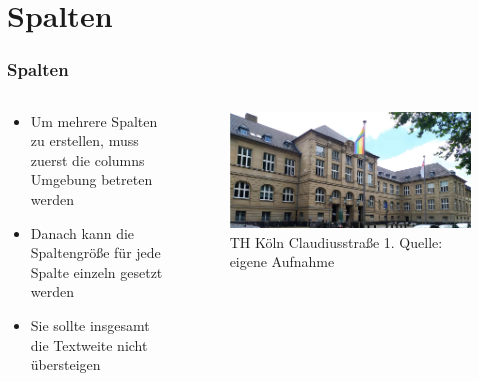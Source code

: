 \documentclass[aspectratio=169]{beamer}
\begin{document}
\section{Spalten}\label{sec:columns}
\begin{frame} 
    \frametitle{Spalten} 
    \begin{columns}
        \begin{column}{0.5\textwidth}
            \begin{itemize}
                \item Um mehrere Spalten zu erstellen, muss zuerst die columns Umgebung betreten werden
                \item Danach kann die Spaltengröße für jede Spalte einzeln gesetzt werden
                \item Sie sollte insgesamt die Textweite nicht übersteigen
            \end{itemize}
        \end{column}
        \begin{column}{0.5\textwidth}
            \begin{center}
                \begin{figure}\label{thk-claudiusstr}
                    \includegraphics[width=\textwidth]{figures/thk.jpg}
                    \caption[TH Köln Claudiusstr.]{TH Köln Claudiusstraße 1. Quelle: eigene Aufnahme}
                \end{figure}
            \end{center}
        \end{column}    
    \end{columns}
    
    
\end{frame}
\end{document}
